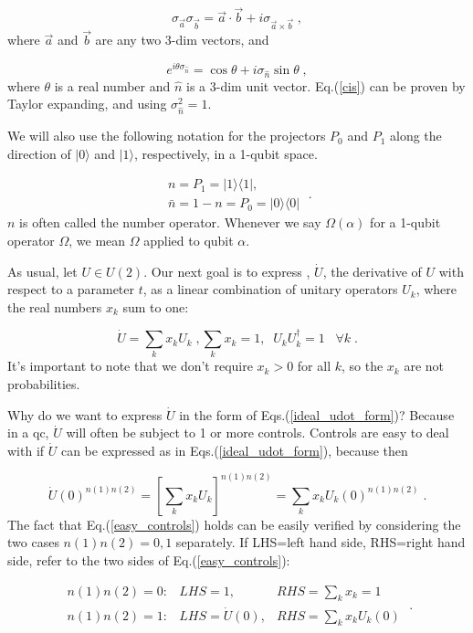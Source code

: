 \documentclass[12pt]{article}
\newcommand{\ket}[1]{|#1\rangle}
\newcommand{\beq}{\begin{equation}}
\newcommand{\eeq}{\end{equation}}
\begin{document}
\beq
\sigma_{\vec{a}}\sigma_{\vec{b}}=\vec{a}\cdot\vec{b}
+ i\sigma_{\vec{a}\times\vec{b}}
\;,
\eeq
where $\vec{a}$ and $\vec{b}$
are any two 3-dim vectors,
and

\beq
e^{i\theta\sigma_{\hat{n}}} = \cos\theta +
i\sigma_{\hat{n}}\sin\theta
\;,
\label{cis}
\eeq
where $\theta$ is a real number and $\hat{n}$
is a 3-dim unit vector. Eq.(\ref{cis})
can be proven by Taylor expanding,
and using $\sigma_{\hat{n}}^2=1$.

We will also use the following notation for the projectors
$P_0$ and $P_1$
along the direction of $\ket{0}$
and $\ket{1}$, respectively,
in a 1-qubit space.

\beq
\begin{array}{l}n=P_1=|1\rangle\langle 1|,\\
\bar{n}=1-n=P_0=|0\rangle\langle 0|
\end{array}
\;.
\eeq
$n$ is often called the number operator.
Whenever we say $\Omega(\alpha)$
for a 1-qubit operator $\Omega$,
we mean $\Omega$ applied to qubit $\alpha$.


As usual,
let $U\in U(2)$.
Our next goal is to express , $\dot{U}$,
the derivative
of $U$  with respect to a
parameter $t$, as a linear
combination
of unitary operators $U_k$,
where the real numbers $x_k$ sum to one:

\begin{subequations}
\label{ideal_udot_form}
\beq
\dot{U}=\sum_k x_k U_k
\;,
\eeq


\beq
\sum_k x_k = 1,\;\;U_kU_k^\dagger=1 \;\;\;\forall k
\;.
\eeq
\end{subequations}
It's important to note that
we don't require $x_k>0$ for all $k$,
so the $x_k$ are not probabilities.

Why do we want to express $\dot{U}$
in the form of Eqs.(\ref{ideal_udot_form})?
Because in a qc, $\dot{U}$
will often be subject to 1 or more controls.
Controls
are easy to deal with
if $\dot{U}$
can be expressed as
in Eqs.(\ref{ideal_udot_form}),
because then

\beq\dot{U}(0)^{n(1)n(2)}=
\left[\sum_k x_k U_k\right]^{n(1)n(2)}
=
\sum_k x_k U_k(0)^{n(1)n(2)}
\;.
\label{easy_controls}
\eeq
The fact that Eq.(\ref{easy_controls})
holds can be easily verified
by considering the two
cases $n(1)n(2)=0,1$ separately. 
If LHS=left hand side,
RHS=right hand side, refer to the two sides of
Eq.(\ref{easy_controls}):


\beq
\begin{array}{lll}
n(1)n(2)=0: &LHS=1,& RHS=\sum_k x_k=1\\
n(1)n(2)=1:&LHS= \dot{U}(0),&RHS= \sum_k x_k U_k(0)
\end{array}
\;.
\eeq
\end{document}
